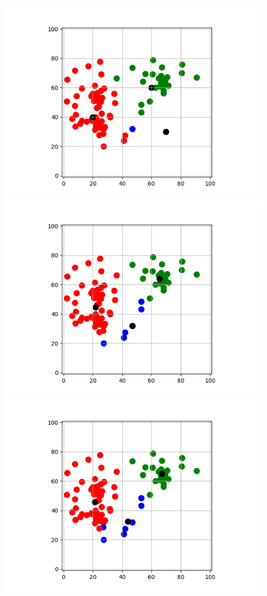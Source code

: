 \documentclass[10pt,class=report,crop=false]{standalone}
\begin{document}
\begin{activite}[Barycentres]
\begin{enumerate}
	
	\begin{center}
	\includegraphics[scale=\myscale,scale=0.32]{ecran_barycentres_exemple_02}
	\includegraphics[scale=\myscale,scale=0.32]{ecran_barycentres_exemple_03}
	\includegraphics[scale=\myscale,scale=0.32]{ecran_barycentres_exemple_04}

\end{center}
\end{enumerate}
\end{activite}
\end{document}
